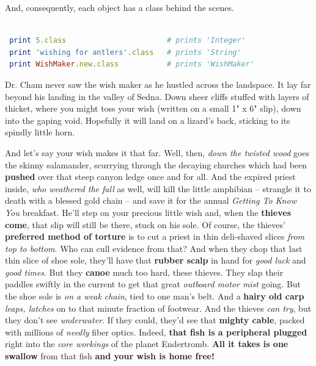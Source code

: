 \documentclass[10pt,twoside]{report}
\begin{document}
And, consequently, each object has a class behind the scenes.


\begin{lstlisting}[basicstyle=\ttfamily\color{basiccolor},
    commentstyle = \ttfamily\color{commentcolor},
    keywordstyle=\ttfamily\color{keywordscolor},
    stringstyle=\color{stringcolor},
    language=Ruby,
    basicstyle=\small\ttfamily,
    showstringspaces=false,
  ]

 print 5.class                       # prints 'Integer'
 print 'wishing for antlers'.class   # prints 'String'
 print WishMaker.new.class           # prints 'WishMaker'

\end{lstlisting}


Dr. Cham never saw the wish maker as he hustled across the
landspace. It lay far beyond his landing in the valley of Sedna.  Down
sheer cliffs stuffed with layers of thicket, where you might toss your
wish (written on a small 1" x 6" slip), down into the gaping void.
Hopefully it will land on a lizard's back, sticking to its spindly
little horn.

And let's say your wish makes it that far.  Well, then, {\em down the
  twisted wood} goes the skinny salamander, scurrying through the
decaying churches which had been {\bf pushed} over that steep canyon
ledge once and for all.  And the expired priest inside, {\em who
  weathered the fall} as well, will kill the little amphibian --
strangle it to death with a blessed gold chain -- and save it for the
annual {\em Getting To Know You} breakfast.  He'll step on your
precious little wish and, when the {\bf thieves come}, that slip will
still be there, stuck on his sole.  Of course, the thieves' {\bf
  preferred method of torture} is to cut a priest in thin deli-shaved
slices {\em from top to bottom}.  Who can cull evidence from that?
And when they chop that last thin slice of shoe sole, they'll have
that {\bf rubber scalp} in hand for {\em good luck} and {\em good
  times}. But they {\bf canoe} much too hard, these thieves.  They
slap their paddles swiftly in the current to get that great {\em
  outboard motor mist} going.  But the shoe sole is {\em on a weak
  chain}, tied to one man's belt.  And a {\bf hairy old carp} {\em
  leaps, latches} on to that minute fraction of footwear.  And the
thieves {\em can try}, but they don't see {\em underwater}.  If they
could, they'd see that {\bf mighty cable}, packed with millions of
{\em needly} fiber optics.  Indeed, {\bf that fish is a peripheral
  plugged} right into the {\em core workings} of the planet
Endertromb.  {\bf All it takes is one swallow} from that fish {\bf and
  your wish is home free!}
\end{document}
